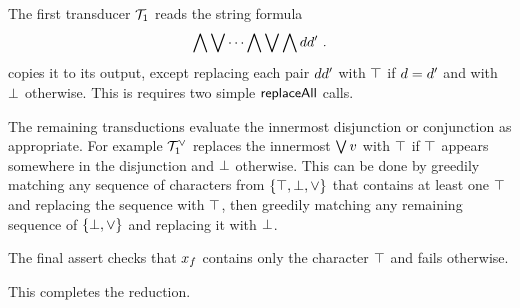 The first transducer $\mathcal{T}_1$ reads the string formula
\[
    \bigwedge \bigvee \cdots \bigwedge \bigvee \bigwedge d d' \ .
\]
copies it to its output, except replacing each pair
$d d'$
with $\top$ if $d = d'$ and with $\bot$ otherwise.
This is requires two simple $\mathsf{replaceAll}$ calls.

The remaining transductions evaluate the innermost disjunction or conjunction as
appropriate. For example
$\mathcal{T}^\lor_1$
replaces the innermost
$\bigvee v$
with $\top$ if $\top$ appears somewhere in the disjunction and
$\bot$ otherwise.
This can be done by greedily matching any sequence of characters from
$\{ \top, \bot, \lor \}$
that contains at least one $\top$ and replacing the sequence with $\top$,
then greedily matching any remaining sequence of
$\{ \bot, \lor \}$
and replacing it with $\bot$.

The final assert checks that $x_f$ contains only the character $\top$
and fails otherwise.

This completes the reduction.
